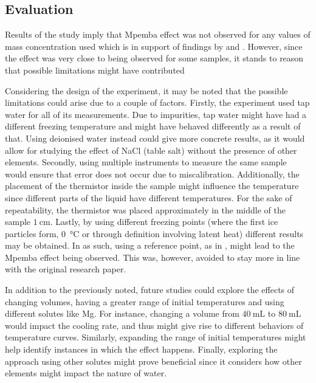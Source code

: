 \documentclass[../main.tex]{subfiles}
\begin{document}
\subsection{Evaluation}
\doublespacing
Results of the study imply that Mpemba effect was not observed for any values of mass concentration used which is in support of findings by \textcite{burridge_questioning_2016} and \textcite{burridge_observing_2020}. However, since the effect was very close to being observed for some samples, it stands to reason that possible limitations might have contributed 

Considering the design of the experiment, it may be noted that the possible limitations could arise due to a couple of factors.
Firstly, the experiment used tap water for all of its measurements. Due to impurities, tap water might have had a different freezing temperature and might have behaved differently as a result of that. Using deionised water instead could give more concrete results, as it would allow for studying the effect of NaCl (table salt) without the presence of other elements.
Secondly, using multiple instruments to measure the same sample would ensure that error does not occur due to miscalibration. Additionally, the placement of the thermistor inside the sample might influence the temperature since different parts of the liquid have different temperatures. For the sake of repeatability, the thermistor was placed approximately in the middle of the sample $\SI{1}{\centi\meter}$. Lastly, by using different freezing points (where the first ice particles form, \SI{0}{\celsius} or through definition involving latent heat) different results may be obtained. In as such, using a reference point, as in \textcite{ibekwe_investigating_2016}, might lead to the Mpemba effect being observed. This was, however, avoided to stay more in line with the original research paper.  \par

In addition to the previously noted, future studies could explore the effects of changing volumes, having a greater range of initial temperatures and using different solutes like Mg. For instance, changing a volume from $\SI{40}{\milli\liter}$ to $\SI{80}{\milli\liter}$ would impact the cooling rate, and thus might give rise to different behaviors of temperature curves. Similarly, expanding the range of initial temperatures might help identify instances in which the effect happens. Finally, exploring the approach using other solutes might prove beneficial since it considers how other elements might impact the nature of water.  \par 
\end{document}
